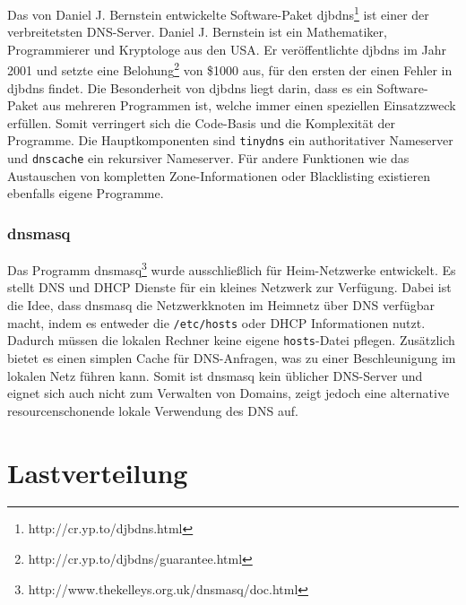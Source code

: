 \documentclass[a4paper, 12pt, BCOR10mm, DIV12, toc=bibliography, toc=listof, german]{scrbook}
\begin{document}
				Das von Daniel J. Bernstein entwickelte Software-Paket
				djbdns\footnote{http://cr.yp.to/djbdns.html} ist einer der verbreitetsten DNS-Server. Daniel
				J.  Bernstein ist ein Mathematiker, Programmierer und Kryptologe aus den USA. Er
				veröffentlichte djbdns im Jahr 2001 und setzte eine
				Belohung\footnote{http://cr.yp.to/djbdns/guarantee.html} von \$1000 aus, für den ersten der
				einen Fehler in djbdns findet. Die Besonderheit von djbdns liegt darin, dass es ein
				Software-Paket aus mehreren Programmen ist, welche immer einen speziellen Einsatzzweck
				erfüllen. Somit verringert sich die Code-Basis und die Komplexität der Programme. Die
				Hauptkomponenten sind \texttt{tinydns} ein authoritativer Nameserver und \texttt{dnscache}
				ein rekursiver Nameserver. Für andere Funktionen wie das Austauschen von kompletten
				Zone-Informationen oder Blacklisting existieren ebenfalls eigene Programme.
				

				\subsubsection*{dnsmasq} %

				Das Programm dnsmasq\footnote{http://www.thekelleys.org.uk/dnsmasq/doc.html} wurde
				ausschließlich für Heim-Netzwerke entwickelt. Es stellt DNS und DHCP Dienste für ein kleines
				Netzwerk zur Verfügung. Dabei ist die Idee, dass dnsmasq die Netzwerkknoten im Heimnetz über
				DNS verfügbar macht, indem es entweder die \texttt{/etc/hosts} oder DHCP Informationen
				nutzt. Dadurch müssen die lokalen Rechner keine eigene \texttt{hosts}-Datei pflegen.
				Zusätzlich bietet es einen simplen Cache für DNS-Anfragen, was zu einer Beschleunigung im
				lokalen Netz führen kann. Somit ist dnsmasq kein üblicher DNS-Server und eignet sich auch
				nicht zum Verwalten von Domains, zeigt jedoch eine alternative resourcenschonende lokale
				Verwendung des DNS auf.
				


			

		\section{Lastverteilung} %
		\label{sec:lastverteilung}
\end{document}
